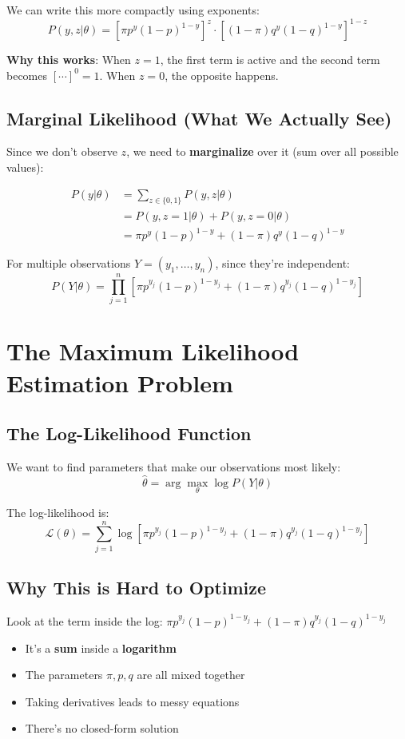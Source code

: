 \begin{notechapter}
We can write this more compactly using exponents:
\[
P(y, z|\theta) = [\pi p^y(1-p)^{1-y}]^z \cdot [(1-\pi) q^y(1-q)^{1-y}]^{1-z}
\]

\textbf{Why this works}: When $z=1$, the first term is active and the second term becomes $[\cdots]^0 = 1$. When $z=0$, the opposite happens.

\subsection{Marginal Likelihood (What We Actually See)}

Since we don't observe $z$, we need to \textbf{marginalize} over it (sum over all possible values):

\begin{align*}
P(y|\theta) &= \sum_{z \in \{0,1\}} P(y, z|\theta) \\
&= P(y, z=1|\theta) + P(y, z=0|\theta) \\
&= \pi p^y(1-p)^{1-y} + (1-\pi) q^y(1-q)^{1-y}
\end{align*}

For multiple observations $Y = (y_1, \ldots, y_n)$, since they're independent:
\[
P(Y|\theta) = \prod_{j=1}^n \left[\pi p^{y_j}(1-p)^{1-y_j} + (1-\pi) q^{y_j}(1-q)^{1-y_j}\right]
\]

\section{The Maximum Likelihood Estimation Problem}

\subsection{The Log-Likelihood Function}

We want to find parameters that make our observations most likely:
\[
\hat{\theta} = \arg\max_{\theta} \log P(Y|\theta)
\]

The log-likelihood is:
\[
\mathcal{L}(\theta) = \sum_{j=1}^n \log\left[\pi p^{y_j}(1-p)^{1-y_j} + (1-\pi) q^{y_j}(1-q)^{1-y_j}\right]
\]

\subsection{Why This is Hard to Optimize}

Look at the term inside the log: $\pi p^{y_j}(1-p)^{1-y_j} + (1-\pi) q^{y_j}(1-q)^{1-y_j}$

\begin{itemize}
    \item It's a \textbf{sum} inside a \textbf{logarithm}
    \item The parameters $\pi, p, q$ are all mixed together
    \item Taking derivatives leads to messy equations
    \item There's no closed-form solution
\end{itemize}


\end{notechapter}
